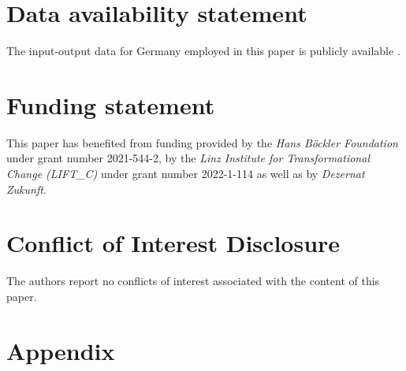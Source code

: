 
\section*{Data availability statement}
The input-output data for Germany employed in this paper is publicly available \citep[see][]{destatis_strukturdaten}.

\section*{Funding statement}

This paper has benefited from funding provided by the \textit{Hans Böckler Foundation} under grant number 2021-544-2, by the \textit{Linz Institute for Transformational Change (LIFT\_C)} under grant number 2022-1-114 as well as by \textit{Dezernat Zukunft}.

\section*{Conflict of Interest Disclosure}

The authors report no conflicts of interest associated with the content of this paper.

\printbibliography
\newpage
\section*{Appendix}

